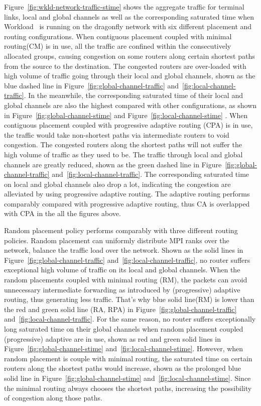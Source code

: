 Figure~\ref{fig:wkld-network-traffic-stime} shows the aggregate traffic for terminal links, local and global channels 
as well as the corresponding saturated time when 
Workload~ is running on the dragonfly network with six different placement and routing configurations. 
When contiguous placement coupled with minimal routing(CM) is in use, 
all the traffic are confined within the consecutively allocated groups, 
causing congestion on some routers along certain shortest paths from the source to the destination. 
The congested routers are over-loaded with high volume of traffic going through their local and global channels, 
shown as the blue dashed line in Figure~\ref{fig:global-channel-traffic} and~\ref{fig:local-channel-traffic}. 
In the meanwhile, the corresponding saturated time of their local and global channels are also the highest compared with other configurations, 
as shown in Figure~\ref{fig:global-channel-stime} and Figure~\ref{fig:local-channel-stime} .
When contiguous placement coupled with progressive adaptive routing (CPA) is in use, 
the traffic would take non-shortest paths via intermediate routers to void congestion. 
The congested routers along the shortest paths will not suffer the high volume of traffic as they used to be. 
The traffic through local and global channels are greatly reduced, 
shown as the green dashed line in Figure~\ref{fig:global-channel-traffic} and~\ref{fig:local-channel-traffic}. 
The corresponding saturated time on local and global channels also drop a lot, 
indicating the congestion are alleviated by using progressive adaptive routing. 
The adaptive routing performs comparably compared with progressive adaptive routing, 
thus CA is overlapped with CPA in the all the figures above.


Random placement policy performs comparably with three different routing policies.
Random placement can uniformly distribute MPI ranks over the network, 
balance the traffic load over the network. 
Shown as the solid lines in Figure~\ref{fig:global-channel-traffic} and~\ref{fig:local-channel-traffic}, 
no router suffers exceptional high volume of traffic on its local and global channels. 
When the random placements coupled with minimal routing (RM), 
the packets can avoid unnecessary intermediate forwarding as introduced by (progressive) adaptive routing, thus generating less traffic. 
That's why blue solid line(RM) is lower than the red and green solid line (RA, RPA) in Figure~\ref{fig:global-channel-traffic} and~\ref{fig:local-channel-traffic}. 
For the same reason, 
no router suffers exceptionally long saturated time on their global channels when random placement coupled (progressive) adaptive are in use, 
shown as red and green solid lines in Figure~\ref{fig:global-channel-stime} and~\ref{fig:local-channel-stime}. 
However, when random placement is couple with minimal routing, 
the saturated time on certain routers along the shortest paths would increase, 
shown as the prolonged blue solid line in Figure~\ref{fig:global-channel-stime} and~\ref{fig:local-channel-stime}. 
Since the minimal routing always chooses the shortest paths, 
increasing the possibility of congestion along those paths. 


